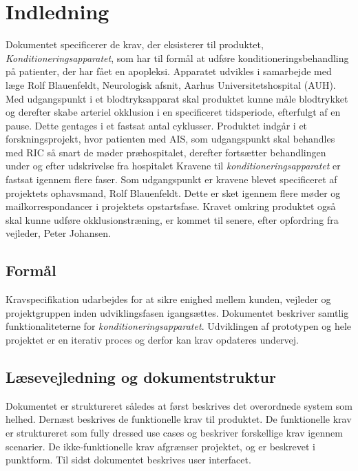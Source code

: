 	\chapter{Indledning}
	Dokumentet specificerer de krav, der eksisterer til produktet, \textit{Konditioneringsapparatet}, som har til formål at udføre konditioneringsbehandling på patienter, der har fået en apopleksi. Apparatet udvikles i samarbejde med læge Rolf Blauenfeldt, Neurologisk afsnit, Aarhus Universitetshospital (AUH). Med udgangspunkt i et blodtryksapparat skal produktet kunne måle blodtrykket og derefter skabe arteriel okklusion i en specificeret tidsperiode, efterfulgt af en pause. Dette gentages i et fastsat antal cyklusser. Produktet indgår i et forskningsprojekt, hvor patienten med AIS, som udgangspunkt skal behandles med RIC så snart de møder præhospitalet, derefter fortsætter behandlingen under og efter udskrivelse fra hospitalet 
	Kravene til \textit{konditioneringsapparatet} er fastsat igennem flere faser. Som udgangspunkt er kravene blevet specificeret af projektets ophavsmand, Rolf Blauenfeldt. Dette er sket igennem flere møder og mailkorrespondancer i projektets opstartsfase. Kravet omkring produktet også skal kunne udføre okklusionstræning, er kommet til senere, efter opfordring fra vejleder, Peter Johansen.
	
	\section{Formål}
	Kravspecifikation udarbejdes for at sikre enighed mellem kunden, vejleder og projektgruppen inden udviklingsfasen igangsættes. Dokumentet beskriver samtlig funktionaliteterne for \textit{konditioneringsapparatet}. Udviklingen af prototypen og hele projektet er en iterativ proces og derfor kan krav opdateres undervej. 
	
	\section{Læsevejledning og dokumentstruktur}
	Dokumentet er struktureret således at først beskrives det overordnede system som helhed. Dernæst beskrives de funktionelle krav til produktet. De funktionelle krav er struktureret som fully dressed use cases og beskriver forskellige krav igennem scenarier. De ikke-funktionelle krav afgrænser projektet, og er beskrevet i punktform. Til sidst dokumentet beskrives user interfacet. 
		\newpage
